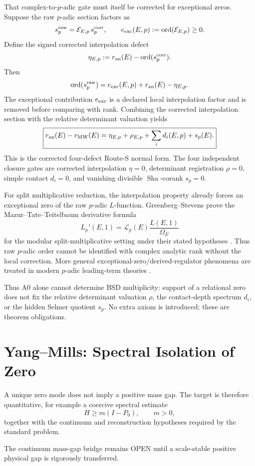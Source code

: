 \documentclass[11pt]{article}
\newcommand{\Sha}{\operatorname{Sha}}
\begin{document}
That complex-to-\(p\)-adic gate must itself be corrected for exceptional zeros. Suppose the raw \(p\)-adic section factors as
\[
s_p^{\rm raw}=\mathcal E_{E,p}\,s_p^{\rm corr},
\qquad
e_{\rm exc}(E,p):=\operatorname{ord}(\mathcal E_{E,p})\ge0.
\]
Define the signed corrected interpolation defect
\[
\eta_{E,p}:=r_{\rm an}(E)-\operatorname{ord}(s_p^{\rm corr}).
\]
Then
\[
\operatorname{ord}(s_p^{\rm raw})
=
e_{\rm exc}(E,p)+r_{\rm an}(E)-\eta_{E,p}.
\]
The exceptional contribution \(e_{\rm exc}\) is a declared local interpolation factor and is removed before comparing with rank. Combining the corrected interpolation section with the relative determinant valuation yields
\[
\boxed{
r_{\rm an}(E)-r_{\rm MW}(E)
=
\eta_{E,p}
+
\rho_{E,p}
+
\sum_i d_i(E,p)
+
s_p(E).
}
\]
This is the corrected four-defect Route-S normal form. The four independent closure gates are corrected interpolation \(\eta=0\), determinant registration \(\rho=0\), simple contact \(d_i=0\), and vanishing divisible \(\Sha\)-corank \(s_p=0\).

For split multiplicative reduction, the interpolation property already forces an exceptional zero of the raw \(p\)-adic \(L\)-function. Greenberg--Stevens prove the Mazur--Tate--Teitelbaum derivative formula
\[
L_p'(E,1)
=
\mathcal L_p(E)\frac{L(E,1)}{\Omega_E}
\]
for the modular split-multiplicative setting under their stated hypotheses \cite{GreenbergStevens1993,MTT1986}. Thus raw \(p\)-adic order cannot be identified with complex analytic rank without the local correction. More general exceptional-zero/derived-regulator phenomena are treated in modern \(p\)-adic leading-term theories \cite{BenoisBuyukboduk2023,BenoisBuyukboduk2026}.

Thus A0 alone cannot determine BSD multiplicity: support of a relational zero does not fix the relative determinant valuation \(\rho\), the contact-depth spectrum \(d_i\), or the hidden Selmer quotient \(s_p\). No extra axiom is introduced; these are theorem obligations.
\section{Yang--Mills: Spectral Isolation of Zero}

A unique zero mode does not imply a positive mass gap. The target is therefore quantitative, for example a coercive spectral estimate
\[
H\ge m(I-P_0),\qquad m>0,
\]
together with the continuum and reconstruction hypotheses required by the standard problem.

The continuum mass-gap bridge remains OPEN until a scale-stable positive physical gap is rigorously transferred.
\end{document}
